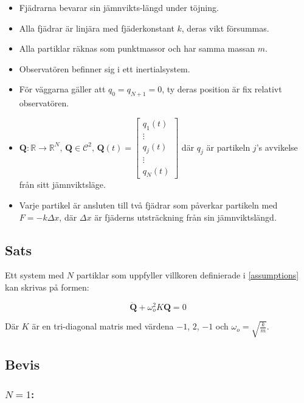 \documentclass[12pt,a4paper]{article}
\newcommand{\R}{\ensuremath{\mathbb{R}}}
\begin{document}
\begin{appendix}
		\begin{itemize}
			\item Fjädrarna bevarar sin jämnvikts-längd under töjning.
			\item Alla fjädrar är linjära med fjäderkonstant $k$, deras vikt försummas.
			\item Alla partiklar räknas som punktmassor och har samma massan $m$.
			\item Observatören befinner sig i ett inertialsystem.
			\item För väggarna gäller att $q_0 = q_{N+1} = 0$, ty deras position är fix relativt observatören.
			\item $\mathbf{Q}: \R \rightarrow \R^N,\, \mathbf{Q} \in \mathcal{C}^2,\,\mathbf{Q}(t) = \begin{bmatrix}q_1(t) \\ \vdots \\ q_j(t) \\ \vdots \\ q_N(t) \end{bmatrix}$ där $q_j$ är
			      partikeln $j$'s avvikelse från sitt jämnviktsläge.
			\item Varje partikel är ansluten till två fjädrar som påverkar partikeln
			      med $F = -k \Delta x$, där $\Delta x$ är fjäderns utsträckning från sin jämnviktslängd.
		\end{itemize}
	
	
	\subsection{Sats}
		\label{sats}
		
		Ett system med $N$ partiklar som uppfyller villkoren definierade i \ref{assumptions} kan skrivas
		på formen:
		
		\begin{equation*}
			\mathbf{\ddot{Q}} + \omega_{o}^{2} K \mathbf{Q} = 0
		\end{equation*}
		
		Där $K$ är en tri-diagonal matris med värdena $-1$, $2$, $-1$ och $\omega_o = \sqrt{\frac{k}{m}}$.
		
	\newpage
	
	\subsection{Bevis}
	\subsubsection*{$N=1$:}
		

\end{appendix}
\end{document}
